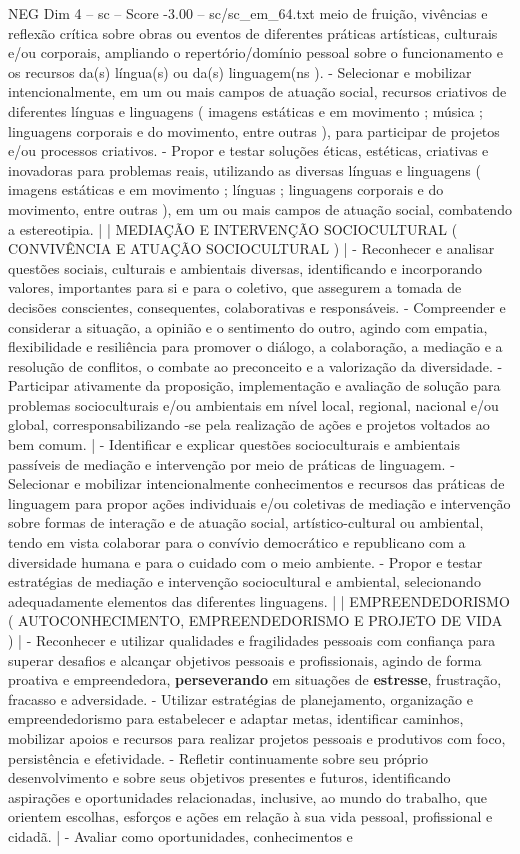 \begin{textsample}{NEG Dim 4 – sc – Score -3.00 – sc/sc\_em\_64.txt}
meio de fruição, vivências e reflexão crítica sobre obras ou eventos de diferentes práticas artísticas, culturais e/ou corporais, ampliando o repertório/domínio pessoal sobre o funcionamento e os recursos da(s) língua(s) ou da(s) linguagem(ns ). - Selecionar e mobilizar intencionalmente, em um ou mais campos de atuação social, recursos criativos de diferentes línguas e linguagens ( imagens estáticas e em movimento ; música ; linguagens corporais e do movimento, entre outras ), para participar de projetos e/ou processos criativos. - Propor e testar soluções éticas, estéticas, criativas e inovadoras para problemas reais, utilizando as diversas línguas e linguagens ( imagens estáticas e em movimento ; línguas ; linguagens corporais e do movimento, entre outras ), em um ou mais campos de atuação social, combatendo a estereotipia. | | MEDIAÇÃO E INTERVENÇÃO SOCIOCULTURAL ( CONVIVÊNCIA E ATUAÇÃO SOCIOCULTURAL ) | - Reconhecer e analisar questões sociais, culturais e ambientais diversas, identificando e incorporando valores, importantes para si e para o coletivo, que assegurem a tomada de decisões conscientes, consequentes, colaborativas e responsáveis. - Compreender e considerar a situação, a opinião e o sentimento do outro, agindo com empatia, flexibilidade e resiliência para promover o diálogo, a colaboração, a mediação e a resolução de conflitos, o combate ao preconceito e a valorização da diversidade. - Participar ativamente da proposição, implementação e avaliação de solução para problemas socioculturais e/ou ambientais em nível local, regional, nacional e/ou global, corresponsabilizando -se pela realização de ações e projetos voltados ao bem comum. | - Identificar e explicar questões socioculturais e ambientais passíveis de mediação e intervenção por meio de práticas de linguagem. - Selecionar e mobilizar intencionalmente conhecimentos e recursos das práticas de linguagem para propor ações individuais e/ou coletivas de mediação e intervenção sobre formas de interação e de atuação social, artístico-cultural ou ambiental, tendo em vista colaborar para o convívio democrático e republicano com a diversidade humana e para o cuidado com o meio ambiente. - Propor e testar estratégias de mediação e intervenção sociocultural e ambiental, selecionando adequadamente elementos das diferentes linguagens. | | EMPREENDEDORISMO ( AUTOCONHECIMENTO, EMPREENDEDORISMO E PROJETO DE VIDA ) | - Reconhecer e utilizar qualidades e fragilidades pessoais com confiança para superar desafios e alcançar objetivos pessoais e profissionais, agindo de forma proativa e empreendedora, \textbf{perseverando} em situações de \textbf{estresse}, frustração, fracasso e adversidade. - Utilizar estratégias de planejamento, organização e empreendedorismo para estabelecer e adaptar metas, identificar caminhos, mobilizar apoios e recursos para realizar projetos pessoais e produtivos com foco, persistência e efetividade. - Refletir continuamente sobre seu próprio desenvolvimento e sobre seus objetivos presentes e futuros, identificando aspirações e oportunidades relacionadas, inclusive, ao mundo do trabalho, que orientem escolhas, esforços e ações em relação à sua vida pessoal, profissional e cidadã. | - Avaliar como oportunidades, conhecimentos e 
\end{textsample}
